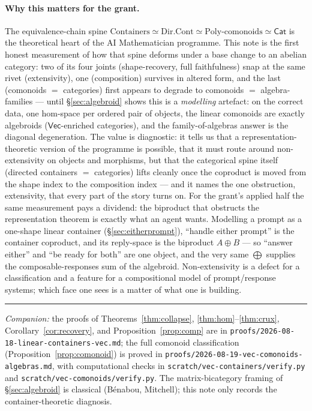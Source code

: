 \documentclass[11pt]{amsart}
\theoremstyle{plain}
\theoremstyle{definition}
\renewcommand{\Vec}{\mathsf{Vec}}
\newcommand{\Cat}{\mathsf{Cat}}
\begin{document}
\paragraph{Why this matters for the grant.}
The equivalence-chain spine $\text{Containers}\simeq\text{Dir.Cont}\simeq
\text{Poly-comonoids}\simeq\Cat$ is the theoretical heart of the AI
Mathematician programme. This note is the first honest measurement of how that
spine deforms under a base change to an abelian category: two of its four joints
(shape-recovery, full faithfulness) snap at the same rivet (extensivity), one
(composition) survives in altered form, and the last (comonoids $=$ categories)
first appears to degrade to comonoids $=$ algebra-families --- until
\S\ref{sec:algebroid} shows this is a \emph{modelling} artefact: on the correct
data, one hom-space per ordered pair of objects, the linear comonoids are exactly
algebroids ($\Vec$-enriched categories), and the family-of-algebras answer is the
diagonal degeneration. The value is diagnostic: it tells us that a
representation-theoretic version of the programme is possible, that it must route
around non-extensivity on objects and morphisms, but that the categorical spine
itself (directed containers $=$ categories) lifts cleanly once the coproduct is
moved from the shape index to the composition index --- and it names the one
obstruction, extensivity, that every part of the story turns on. For the grant's
applied half the same measurement pays a dividend: the biproduct that obstructs the
representation theorem is exactly what an agent wants. Modelling a prompt as a
one-shape linear container (\S\ref{sec:eitherprompt}), ``handle either prompt'' is the
container coproduct, and its reply-space is the biproduct $A\oplus B$ --- so ``answer
either'' and ``be ready for both'' are one object, and the very same $\bigoplus$
supplies the composable-responses sum of the algebroid. Non-extensivity is a defect for
a classification and a feature for a compositional model of prompt/response systems;
which face one sees is a matter of what one is building.

\vspace{1em}
\hrule
\vspace{0.5em}
\sloppy
\noindent\emph{Companion:} the proofs of Theorems~\ref{thm:collapse},
\ref{thm:hom}--\ref{thm:crux}, Corollary~\ref{cor:recovery}, and
Proposition~\ref{prop:comp} are in
\texttt{proofs/2026-08-18-linear-containers-vec.md}; the full comonoid
classification (Proposition~\ref{prop:comonoid}) is proved in
\texttt{proofs/2026-08-19-vec-comonoids-algebras.md}, with computational checks in
\texttt{scratch/vec-containers/verify.py} and
\texttt{scratch/vec-comonoids/verify.py}. The matrix-bicategory framing of
\S\ref{sec:algebroid} is classical (B\'enabou, Mitchell); this note only records the
container-theoretic diagnosis.
\end{document}
